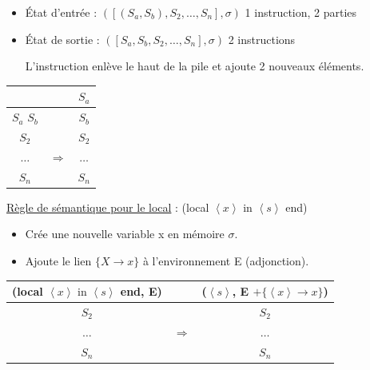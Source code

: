 \documentclass[fr,license=none]{../../../eplsummary}
\begin{document}
\begin{flushleft}
\begin{itemize}
\item État d'entrée : \textcolor{miorangerouge}{$([(S_a, S_b), S_2, \ldots , S_n ], \sigma )$} 1 instruction, 2 parties
\item État de sortie : \textcolor{miorangerouge}{$([S_a, S_b, S_2, \ldots , S_n ], \sigma )$} 2 instructions

L'instruction enlève le haut de la pile et ajoute 2 nouveaux éléments.
\end{itemize}\bigbreak

\begin{center}
\begin{tabular}{|c|c|c|}
 & & $S_a$ \\
\hline
$S_a$ $S_b$ & & $S_b$\\
\hline
$S_2$ & & $S_2$\\
\hline
$\ldots$ & $\Rightarrow$ & $\ldots$\\
\hline
$S_n$ & & $S_n$\\
\hline
\end{tabular}
\end{center}
\newpage




\textcolor{mauvedef}{\underline{Règle de sémantique pour le local}} : (\textcolor{miorangerouge}{local $\left\langle x \right\rangle \text{ in } \left\langle s \right\rangle$ end})

\begin{itemize}
\item Crée une nouvelle variable \textcolor{miorangerouge}{x} en mémoire \textcolor{miorangerouge}{$\sigma$}.
\item Ajoute le lien \textcolor{miorangerouge}{$\{ X \rightarrow x \}$} à l'environnement \textcolor{miorangerouge}{E} (adjonction).
\end{itemize}\bigbreak

\begin{center}
\begin{tabular}{|c|c|c|}
(local $\left\langle x \right\rangle \text{ in } \left\langle s \right\rangle$ end, E) & & ($\left\langle s \right\rangle$, E $+ \{ \left\langle x \right\rangle \rightarrow x \}$)\\
\hline
$S_2$ & & $S_2$\\
\hline
$\ldots$ & $\Rightarrow$ & $\ldots$\\
\hline
$S_n$ & & $S_n$\\
\hline
\end{tabular}
\end{center}
\bigbreak


\end{flushleft}
\end{document}
